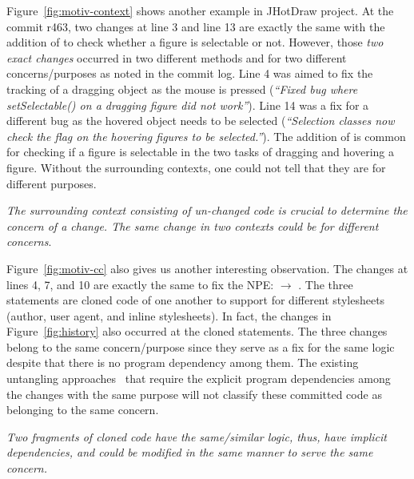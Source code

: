 Figure~\ref{fig:motiv-context} shows another example in JHotDraw
project. At the commit r463, two changes at line 3 and line 13 are
exactly the same with the addition of  to
check whether a figure is selectable or not. However, those {\em two
  exact changes} occurred in two different methods 
and  for two different concerns/purposes as
noted in the commit log. Line 4 was aimed to fix the tracking of a
dragging object as the mouse is pressed ({\em ``Fixed bug where
  setSelectable() on a dragging figure did not work''}).  Line 14 was
a fix for a different bug as the hovered object needs to be selected
({\em ``Selection classes now check the flag on the hovering figures
  to be selected.''}). The addition of  is
common for checking if a figure is selectable in the two tasks of
dragging and hovering a figure. Without the surrounding contexts,
one could not tell that they are for different purposes.

\vspace{3pt}
 {\em The surrounding context
  consisting of un-changed code is crucial to determine the
  concern of a change. The same change in two 
  contexts could be for different concerns}.

Figure~\ref{fig:motiv-cc} also gives us another interesting
observation. The changes at lines 4, 7, and 10 are exactly the same to
fix the NPE:  $\rightarrow$ .
The three statements are cloned code of one another to support for
different stylesheets (author, user agent, and inline stylesheets).
In fact, the changes in Figure~\ref{fig:history} also occurred at the
cloned statements. The three changes belong to the same
concern/purpose since they serve as a fix for the same logic despite
that there is no program dependency among them. The existing
untangling
approaches~\cite{flexeme-fse20,smartcommit-fse21,roover-scam18,barnett-icse15}
that require the explicit program dependencies among the changes with
the same purpose will not classify these committed code as belonging
to the same concern.


\vspace{2pt}
 {\em Two
  fragments of cloned code have the same/similar logic, thus, have
  implicit dependencies, and could be modified in the same manner to
  serve the same concern.}




